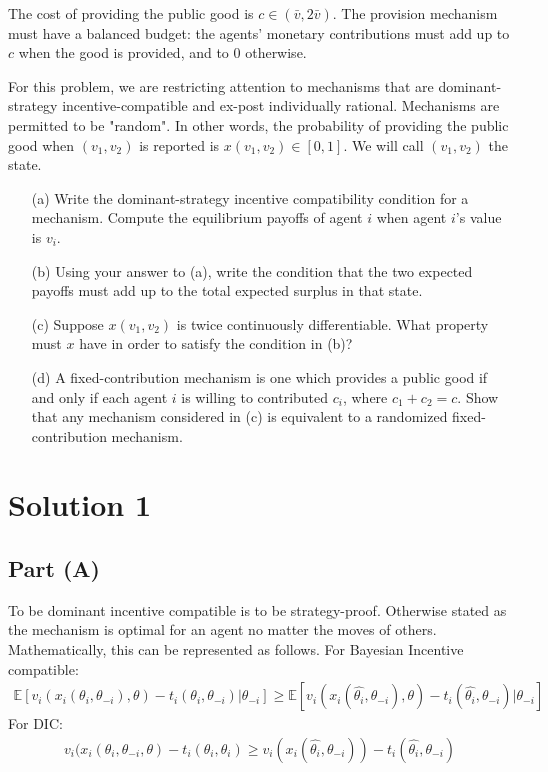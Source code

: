 \documentclass[10pt,a4paper]{article}
\begin{document}
  The cost of providing the public good is $c \in (\bar{v}, 2\bar{v})$. The provision mechanism must have a balanced budget: the agents' monetary contributions must add up to $c$ when the good is provided, and to 0 otherwise.

  For this problem, we are restricting attention to mechanisms that are dominant-strategy incentive-compatible and ex-post individually rational. Mechanisms are permitted to be "random". In other words, the probability of providing the public good when $(v_1, v_2)$ is reported is $x(v_1, v_2) \in [0, 1]$. We will call $(v_1, v_2)$ the state.

  \begin{enumerate}
      \item[(a)] Write the dominant-strategy incentive compatibility condition for a mechanism. Compute the equilibrium payoffs of agent $i$ when agent $i$'s value is $v_i$.
      \item[(b)] Using your answer to (a), write the condition that the two expected payoffs must add up to the total expected surplus in that state.
      \item[(c)] Suppose $x(v_1, v_2)$ is twice continuously differentiable. What property must $x$ have in order to satisfy the condition in (b)?
      \item[(d)] A fixed-contribution mechanism is one which provides a public good if and only if each agent $i$ is willing to contributed $c_i$, where $c_1 + c_2 = c$. Show that any mechanism considered in (c) is equivalent to a randomized fixed-contribution mechanism.
  \end{enumerate}

\section*{Solution 1}
  \subsection*{Part (A)}
    To be dominant incentive compatible is to be strategy-proof. Otherwise stated as the mechanism is optimal for an agent no matter the moves of others. Mathematically, this can be represented as follows. For Bayesian Incentive compatible:
    \begin{gather*}
      \mathbb{E}[v_i(x_i(\theta_i, \theta_{-i}),\theta) - t_i(\theta_i,\theta_{-i})|\theta_{-i}] \geq \mathbb{E}[v_i(x_i(\hat{\theta_i}, \theta_{-i}),\theta) - t_i(\hat{\theta_i},\theta_{-i})|\theta_{-i}]
    \end{gather*}
    For DIC:
    \begin{gather*}
      v_i(x_i(\theta_i,\theta_{-i},\theta) - t_i(\theta_i,\theta_{i}) \geq v_i(x_i(\hat{\theta_i},\theta_{-i})) - t_i(\hat{\theta_i},\theta_{-i})
    \end{gather*}
\end{document}
